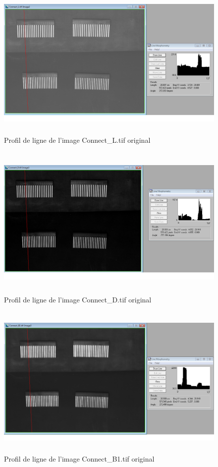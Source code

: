 \documentclass{scrreprt}
\begin{document}
\begin{figure}[!h]
\centering
\includegraphics[height=7.5cm,width=15cm]{images/connectLline.png}
\caption{Profil de ligne de l'image Connect_L.tif original}
\end{figure}

\newpage
\begin{figure}[!h]
\centering
\includegraphics[height=7.5cm,width=15cm]{images/connectDline.png}
\caption{Profil de ligne de l'image Connect_D.tif original}
\end{figure}

\begin{figure}[!h]
\centering
\includegraphics[height=7.5cm,width=15cm]{images/connectB1line.png}
\caption{Profil de ligne de l'image Connect_B1.tif original}
\end{figure}
\end{document}
